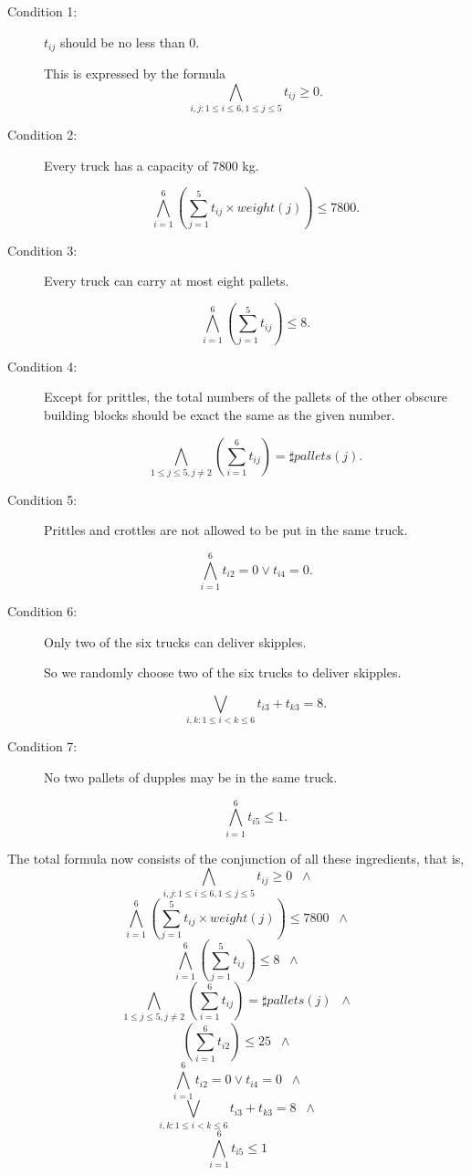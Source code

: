 \documentclass[11pt]{article}
\begin{document}
\begin{description}
  \item[Condition 1:] $t_{ij}$ should be no less than $0$.

  This is expressed by the formula
  \[ \bigwedge_{i,j:1 \leq i \leq 6, 1 \leq j \leq 5} t_{ij} \geq 0.\]
  \item[Condition 2:] Every truck has a capacity of 7800 kg.

  \[ \bigwedge_{i=1}^6  (\sum_{j=1}^5 t_{ij} \times weight(j)) \leq 7800 .\]
  \item[Condition 3:] Every truck can carry at most eight pallets.

  \[ \bigwedge_{i=1}^6 (\sum_{j=1}^5 t_{ij}) \leq 8 .\]
  \item[Condition 4:] Except for prittles, the total numbers of the pallets of the other obscure building blocks should be exact the same as the given number.

  \[ \bigwedge_{1\leq j \leq5, j\neq2} (\sum_{i=1}^6 t_{ij}) = \sharp pallets(j) .\]
  
  \item[Condition 5:] Prittles and crottles are not allowed to be put in the same truck.

  \[ \bigwedge_{i=1}^6 t_{i2}=0 \vee t_{i4}=0 .\]
  \item[Condition 6:] Only two of the six trucks can deliver skipples.
      
      So we randomly choose two of the six trucks to deliver skipples.

  \[ \bigvee_{i,k:1 \leq i < k \leq 6} t_{i3} + t_{k3} = 8 .\]
  \item[Condition 7:] No two pallets of dupples may be in the same truck.

  \[ \bigwedge_{i=1}^6 t_{i5} \leq 1 .\]
\end{description}

The total formula now consists of the conjunction of all these
ingredients, that is,
\[ \bigwedge_{i,j:1 \leq i \leq 6, 1 \leq j \leq 5} t_{ij} \geq 0 \;\; \wedge \]
\[ \bigwedge_{i=1}^6  (\sum_{j=1}^5 t_{ij} \times weight(j)) \leq 7800 \;\; \wedge \]
\[ \bigwedge_{i=1}^6 (\sum_{j=1}^5 t_{ij}) \leq 8 \;\; \wedge \]
\[ \bigwedge_{1\leq j \leq5, j\neq2} (\sum_{i=1}^6 t_{ij}) = \sharp pallets(j) \;\; \wedge \]
\[ (\sum_{i=1}^6 t_{i2}) \leq 25 \;\; \wedge \]
\[ \bigwedge_{i=1}^6 t_{i2}=0 \vee t_{i4}=0 \;\; \wedge \]
\[ \bigvee_{i,k:1 \leq i < k \leq 6} t_{i3} + t_{k3} = 8 \;\; \wedge \]
\[ \bigwedge_{i=1}^6 t_{i5} \leq 1 \]
\end{document}
